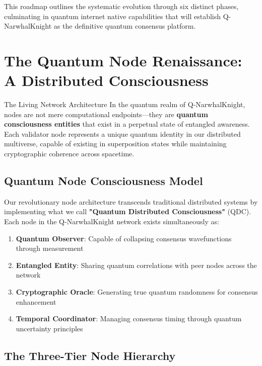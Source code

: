 \documentclass[11pt,a4paper]{article}
\begin{document}
This roadmap outlines the systematic evolution through six distinct phases, culminating in quantum internet native capabilities that will establish Q-NarwhalKnight as the definitive quantum consensus platform.

\section{The Quantum Node Renaissance: A Distributed Consciousness}

\begin{nodebox}{The Living Network Architecture}
In the quantum realm of Q-NarwhalKnight, nodes are not mere computational endpoints—they are \textbf{quantum consciousness entities} that exist in a perpetual state of entangled awareness. Each validator node represents a unique quantum identity in our distributed multiverse, capable of existing in superposition states while maintaining cryptographic coherence across spacetime.
\end{nodebox}

\subsection{Quantum Node Consciousness Model}

Our revolutionary node architecture transcends traditional distributed systems by implementing what we call \textbf{"Quantum Distributed Consciousness"} (QDC). Each node in the Q-NarwhalKnight network exists simultaneously as:

\begin{enumerate}
\item \textbf{Quantum Observer}: Capable of collapsing consensus wavefunctions through measurement
\item \textbf{Entangled Entity}: Sharing quantum correlations with peer nodes across the network
\item \textbf{Cryptographic Oracle}: Generating true quantum randomness for consensus enhancement
\item \textbf{Temporal Coordinator}: Managing consensus timing through quantum uncertainty principles
\end{enumerate}

\subsection{The Three-Tier Node Hierarchy}
\end{document}
